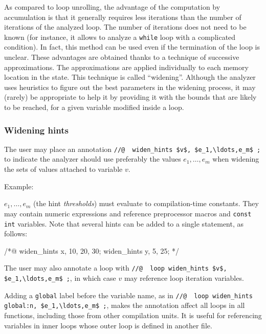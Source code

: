 \documentclass{frama-c-book}
\begin{document}
As compared to loop unrolling, the advantage of the computation
by accumulation is that it generally requires less iterations
than the number of iterations of the analyzed loop. The number of
iterations does not need to be known (for instance, it allows to
analyze a \lstinline|while| loop with a complicated condition).
In fact, this method can be used even if the termination of
the loop is unclear. These advantages are obtained thanks to
a technique of successive approximations. The approximations
are applied individually to each memory location in the state.
This technique is called ``widening''.
Although the analyzer uses heuristics to figure out the best
parameters in the widening process, it may (rarely) be appropriate
to help it by providing it with the bounds that are likely to
be reached, for a given variable modified inside a loop.

\subsubsection{Widening hints}
\label{subsub:widen-hints}

The user may place an annotation \lstinline|//@  widen_hints $v$, $e_1,\ldots,e_m$ ;|
to indicate the analyzer should use preferably the values $e_1,\ldots,e_m$
when widening the sets of values attached to variable $v$.

Example:

$e_1,\ldots,e_m$ (the hint \emph{thresholds}) must evaluate to compilation-time
constants. They may contain numeric expressions and reference preprocessor
macros and \lstinline|const int| variables.
Note that several hints can be added to a single statement, as follows:

\begin{listing-nonumber}
  /*@ widen_hints x, 10, 20, 30;
      widen_hints y, 5, 25; */
\end{listing-nonumber}

The user may also annotate a loop with
\lstinline|//@  loop widen_hints $v$, $e_1,\ldots,e_m$ ;|,
in which case $v$ may reference loop iteration variables.

Adding a \lstinline|global| label before the variable name, as in
\lstinline|//@  loop widen_hints global:n, $e_1,\ldots,e_m$ ;|,
makes the annotation affect all loops in all functions, including
those from other compilation units. It is useful for referencing variables
in inner loops whose outer loop is defined in another file.
\end{document}

